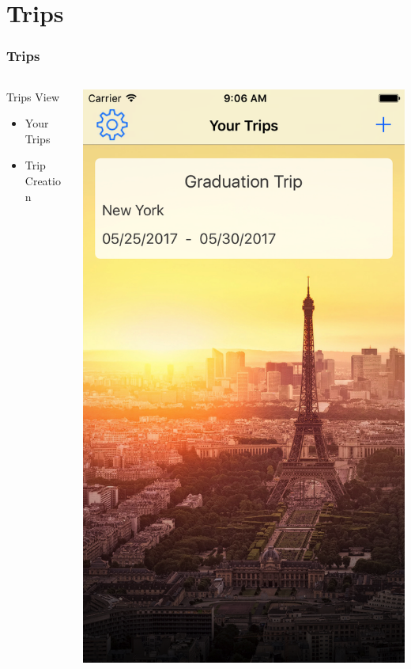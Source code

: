 \documentclass{beamer}
\begin{document}
\section{Trips}
\begin{frame}
\frametitle{Trips}
\begin{columns}
    \begin{column}{0.3\textwidth}
        Trips View
        \begin{itemize}
            \item Your Trips
            \item Trip Creation
        \end{itemize}
    \end{column}
    \begin{column}{0.3\textwidth}  %
        \begin{center}
            \includegraphics[scale=0.14]{trips}

\end{center}
\end{column}
\end{columns}
\end{frame}
\end{document}
